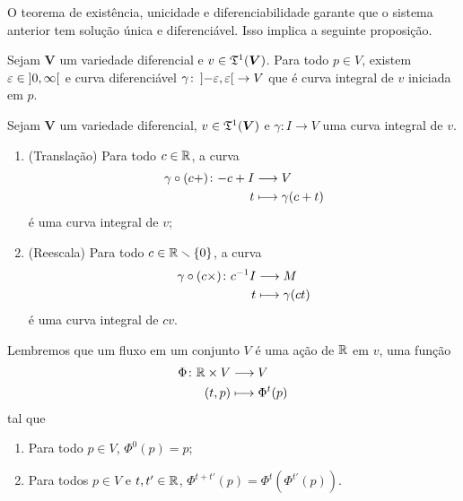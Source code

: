 O teorema de existência, unicidade e diferenciabilidade garante que o sistema anterior tem solução única e diferenciável. Isso implica a seguinte proposição.

\begin{proposition}
Sejam $\bm V$ um variedade diferencial e $v \in \mathfrak{T}^1(\bm V)$. Para todo $p \in V$, existem $\varepsilon \in \left]0,\allowbreak \infty\right[$ e curva diferenciável $\gamma\colon \left]-\varepsilon,\allowbreak \varepsilon\right[ \to V$ que é curva integral de $v$ iniciada em $p$.
\end{proposition}

\begin{proposition}
Sejam $\bm V$ um variedade diferencial, $v \in \mathfrak{T}^1(\bm V)$ e $\gamma\colon I \to V$ uma curva integral de $v$.
	\begin{enumerate}
	\item (Translação) Para todo $c \in \mathbb{R}$, a curva
		\begin{align*}
		{\gamma \circ (c +)}\colon {-c + I} &\longrightarrow {V} \\{t} &\longmapsto \gamma(c+t)
		\end{align*}
é uma curva integral de $v$;

	\item (Reescala) Para todo $c \in \mathbb{R} \smallsetminus \{0\}$, a curva
		\begin{align*}
		{\gamma \circ (c \times)}\colon {c^{-1}I} &\longrightarrow {M} \\{t} &\longmapsto \gamma(ct)
		\end{align*}
é uma curva integral de $cv$.
	\end{enumerate}
\end{proposition}

Lembremos que um fluxo em um conjunto $V$ é uma ação de $\mathbb{R}$ em $v$, uma função
	\begin{align*}
	{\Phi}\colon {\mathbb{R}\times V} &\longrightarrow {V} \\{(t,p)} &\longmapsto \Phi^t(p)
	\end{align*}
tal que
	\begin{enumerate}
	\item Para todo $p \in V$, $\Phi^0(p) = p$;
	\item Para todos $p \in V$ e $t,t' \in \mathbb{R}$, $\Phi^{t+t'}(p) = \Phi^t(\Phi^{t'}(p))$.
	\end{enumerate}

